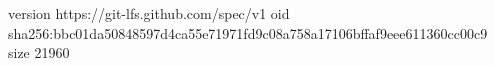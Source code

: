 version https://git-lfs.github.com/spec/v1
oid sha256:bbc01da50848597d4ca55e71971fd9c08a758a17106bffaf9eee611360cc00c9
size 21960
